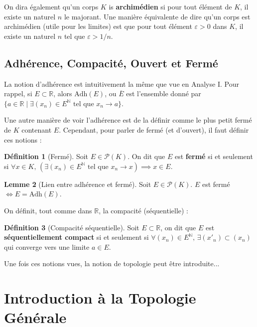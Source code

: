 \documentclass[12pt, a4paper]{report}
\theoremstyle{definition}
\newtheorem{definition}{Définition}[chapter]
\newtheorem{lemme}[definition]{Lemme}
\begin{document}
On dira également qu'un corps $K$ is \textbf{archimédien} si pour tout élément de $K$, il existe un naturel $n$ le majorant. Une manière équivalente de dire qu'un corps est archimédien (utile pour les limites) est que pour tout élément $\varepsilon > 0$ dans $K$, il existe un naturel $n$ tel que $\varepsilon > 1/n$.

\section{Adhérence, Compacité, Ouvert et Fermé}
La notion d'adhérence est intuitivement la même que vue en Analyse I. Pour rappel, si $E \subset \mathbb{R}$, alors $\text{Adh}(E)$, ou $\overline{E}$ est l'ensemble donné par $\{ a \in \mathbb{R} \mid \exists (x_n) \in E^{\mathbb{N}} \text{ tel que } x_n \to a \}$.

Une autre manière de voir l'adhérence est de la définir comme le plus petit fermé de $K$ contenant $E$. Cependant, pour parler de fermé (et d'ouvert), il faut définir ces notions :

\begin{definition}[Fermé]
Soit $E \in \mathcal{P}(K)$. On dit que $E$ est \textbf{fermé} si et seulement si $\forall x \in K, \, (\exists (x_n) \in E^{\mathbb{N}} \text{ tel que } x_n \to x) \implies x \in E$. 
\end{definition}

\begin{lemme}[Lien entre adhérence et fermé]
Soit $E \in \mathcal{P}(K)$. $E$ est fermé $\iff E = \text{Adh}(E)$.
\end{lemme}

On définit, tout comme dans $\mathbb{R}$, la compacité (séquentielle) :
\begin{definition}[Compacité séquentielle]
Soit $E \subset \mathbb{R}$, on dit que $E$ est \textbf{séquentiellement compact} si et seulement si $\forall (x_n) \in E^{\mathbb{N}}, \, \exists (x'_n) \subset (x_n)$ qui converge vers une limite $a \in E$.
\end{definition}
Une fois ces notions vues, la notion de topologie peut être introduite...
 
\chapter{Introduction à la Topologie Générale}
\end{document}
